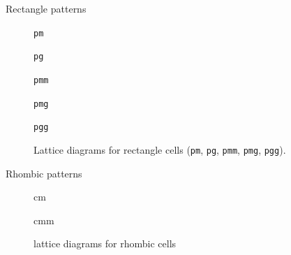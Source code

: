\documentclass{beamer}
\begin{document}
\begin{frame}{Rectangle patterns}
  \begin{figure}
    \centering
    \begin{minipage}[t]{0.31\textwidth}
      \centering
      
      \caption*{\texttt{pm}}
    \end{minipage}\hfill
    \begin{minipage}[t]{0.29\textwidth}
      \centering
      
      \caption*{\texttt{pg}}
    \end{minipage}\hfill
    \begin{minipage}[t]{0.31\textwidth}
      \centering
      
      \caption*{\texttt{pmm}}
    \end{minipage}


    \begin{minipage}[t]{0.32\textwidth}
      \centering
      
      \caption*{\texttt{pmg}}
    \end{minipage}
    \begin{minipage}[t]{0.32\textwidth}
      \centering
      
      \caption*{\texttt{pgg}}
    \end{minipage}

    \caption{Lattice diagrams for rectangle cells (\texttt{pm}, \texttt{pg}, \texttt{pmm}, \texttt{pmg}, \texttt{pgg}).}
  \end{figure}
\end{frame}



\begin{frame}{Rhombic patterns}
  \begin{figure}
    \centering
    \begin{minipage}[t]{0.45\textwidth}
      \centering
      
      \caption*{cm}
    \end{minipage}\hfill%
    \begin{minipage}[t]{0.45\textwidth}
      \centering
      
      \caption*{cmm}
    \end{minipage}
    \caption{lattice diagrams for rhombic cells}
  \end{figure}
\end{frame}
\end{document}
